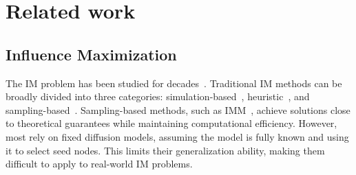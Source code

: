 

\section{Related work}

\subsection{Influence Maximization}

The IM problem has been studied for decades~\cite{zareie2023influence_survey, lihui2023_influence_survey, TKDE18_li2018influence_survey}.
Traditional IM methods can be broadly divided into three categories: 
simulation-based~\cite{kempe2003im, leskovec2007CELF, wang2010-simu}, 
heuristic~\cite{chen2009DegreeDiscountIC, chen2010MIA, chen2010LDAG, goyal2011simpath}, 
and sampling-based~\cite{tang2015IMM, wang2016BKRIS, NIPS2024_Rui, WWW2024-Chen}.
Sampling-based methods, such as IMM~\cite{tang2015IMM}, achieve solutions close to theoretical guarantees while maintaining computational efficiency. However, most rely on fixed diffusion models, assuming the model is fully known and using it to select seed nodes. This limits their generalization ability, making them difficult to apply to real-world IM problems.

